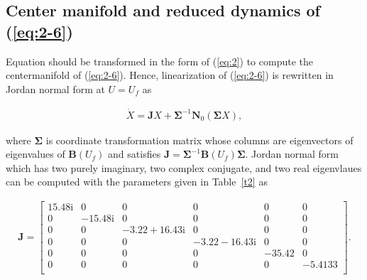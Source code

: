 \documentclass[openacc]{rsproca_new}%
\def\vec#1{\ensuremath{\mathbf{#1}}}
\newcommand{\Eref}[1]{(\ref{#1})}
\newcommand{\Tref}[1]{Table~\ref{#1}}
\begin{document}
\begin{appendices}
\gdef\thesection{Appendix \Alph{section}}

\section{Center manifold and reduced dynamics of \Eref{eq:2-6}} \label{ap1}
Equation should be transformed in the form of \Eref{eq:2} to compute the centermanifold of \Eref{eq:2-6}. Hence, linearization of \Eref{eq:2-6} is rewritten in Jordan normal form at $U=U_f$ as

\begin{align} \label{A1}
\dot X=\vec{J}X+\vec{\Sigma}^{-1} \vec{N}_0(\vec{\Sigma} X),
\end{align}

\noindent where $\vec{\Sigma}$ is coordinate transformation matrix whose columns are eigenvectors of eigenvalues of $\vec{B}(U_f)$ and satisfies $\vec{J}=\vec{\Sigma}^{-1}\vec{B}(U_f)\vec{\Sigma}$. Jordan normal form which has two purely imaginary, two complex conjugate, and two real eigenvlaues can be computed with the parameters given in \Tref{t2} as

\begin{align}
\vec{J}=
\begin{bmatrix}
   15.48 \textrm{i}       & 0 & 0 & 0 & 0 & 0 \\
    0       & -15.48 \textrm{i} & 0 & 0 & 0 & 0 \\
    0       & 0 & -3.22+16.43\textrm{i} & 0 & 0 & 0\\
    0       & 0 & 0 & -3.22-16.43\textrm{i} & 0 & 0\\
    0       & 0 & 0 & 0 & -35.42 & 0\\
    0       & 0 & 0 & 0 & 0 & -5.4133\\
\end{bmatrix}.
\end{align}


\end{appendices}
\end{document}
